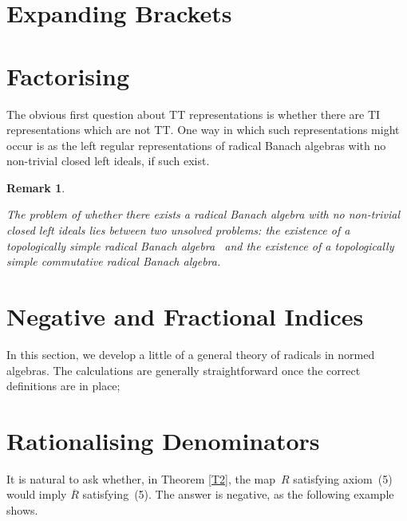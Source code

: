 \documentclass[11pt]{article}
\newtheorem{remk}[thm]{Remark}
\newenvironment{Remark}{\begin{remk}\begin{rm}}{\end{rm}\end{remk}}
\newcommand{\detail}[1]{}
\newcommand{\Rbar}{\overline{R}}
\begin{document}
\section{Expanding  Brackets}\label{S4}


\section{Factorising}\label{S4a}

The obvious first question about TT representations is whether there are
TI representations which are not TT.   One way in which such representations
might occur is as the left regular representations of radical Banach algebras
with no non-trivial closed left ideals, if such exist.


\begin{Remark}
The problem of whether there exists a radical Banach algebra with no non-trivial
closed left ideals lies between two unsolved problems: the existence of a
topologically simple radical Banach algebra \detail{no non-trivial closed
two-sided ideals}\ and the existence of a topologically simple commutative
radical Banach algebra.  \detail{Might it be equivalent to one of these questions?}
\end{Remark}


\section{Negative and Fractional Indices}\label{S5}

In this section, we develop a little of a general theory of radicals in
normed algebras.    The calculations are generally straightforward once the
correct definitions are in place; 
\section{Rationalising Denominators}\label{S5a}

It is natural to ask whether, in Theorem \ref{T2}, the map~$R$ satisfying
axiom~(5) would imply $\Rbar$ satisfying~(5).    The answer is negative,
as the following example shows.
\end{document}
